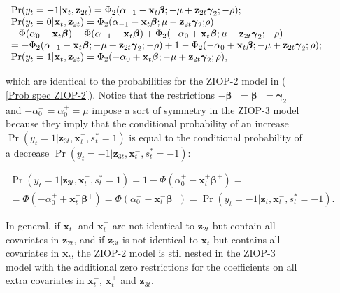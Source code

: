 \documentclass[letterpaper,fleqn,12pt]{article}
\begin{document}
\begin{figure}[H]
\begin{onehalfspace}
\bigskip

$%
\begin{array}{l}
\Pr (y_{t}=-1|\mathbf{x}_{t},\mathbf{z}_{2t})=\Phi _{2}(\alpha _{-1}-\mathbf{%
x}_{t}\mathbf{\beta };-\mu +\mathbf{z}_{2t}\mathbf{\gamma }_{2}\mathbf{;-}%
\rho ); \\ 
\Pr (y_{t}=0|\mathbf{x}_{t},\mathbf{z}_{2t})=\Phi _{2}(\alpha _{-1}-\mathbf{x%
}_{t}\mathbf{\beta };\mu -\mathbf{z}_{2t}\mathbf{\gamma }_{2}\mathbf{;}\rho )
\\ 
+\Phi (\alpha _{0}-\mathbf{x}_{t}\mathbf{\beta })-\Phi (\alpha _{-1}-\mathbf{%
x}_{t}\mathbf{\beta })+\Phi _{2}(-\alpha _{0}+\mathbf{x}_{t}\mathbf{\beta }%
;\mu -\mathbf{z}_{2t}\mathbf{\gamma }_{2};\mathbf{-}\rho ) \\ 
=-\Phi _{2}(\alpha _{-1}-\mathbf{x}_{t}\mathbf{\beta };-\mu +\mathbf{z}_{2t}%
\mathbf{\gamma }_{2}\mathbf{;-}\rho )+1-\Phi _{2}(-\alpha _{0}+\mathbf{x}_{t}%
\mathbf{\beta };-\mu +\mathbf{z}_{2t}\mathbf{\gamma }_{2};\rho ); \\ 
\Pr (y_{t}=1|\mathbf{x}_{t},\mathbf{z}_{2t})=\Phi _{2}(-\alpha _{0}+\mathbf{x%
}_{t}\mathbf{\beta };-\mu +\mathbf{z}_{2t}\mathbf{\gamma }_{2};\rho ),%
\end{array}%
$

\bigskip

\noindent which are identical to the probabilities for the ZIOP-2 model in (%
\ref{Prob spec ZIOP-2}). Notice that the restrictions $-\mathbf{\beta }^{-}=%
\mathbf{\beta }^{+}=\mathbf{\gamma }_{2}$ and $-\alpha _{0}^{-}=\alpha
_{0}^{+}=\mu $ impose a sort of symmetry in the ZIOP-3 model because they
imply that the conditional probability of an increase $\Pr (y_{t}=1|\mathbf{z%
}_{3t},\mathbf{x}_{t}^{+},s_{t}^{\ast }=1)$ is equal to the conditional
probability of a decrease $\Pr (y_{t}=-1|\mathbf{z}_{3t},\mathbf{x}%
_{t}^{-},s_{t}^{\ast }=-1)$:

\medskip

\begin{gather*}
\Pr (y_{t}=1|\mathbf{z}_{3t},\mathbf{x}_{t}^{+},s_{t}^{\ast }=1)=1-\Phi
(\alpha _{0}^{+}-\mathbf{x}_{t}^{+}\mathbf{\beta }^{+})= \\
=\Phi (-\alpha _{0}^{+}+\mathbf{x}_{t}^{+}\mathbf{\beta }^{+})=\Phi (\alpha
_{0}^{-}-\mathbf{x}_{t}^{-}\mathbf{\beta }^{-})=\Pr (y_{t}=-1|\mathbf{z}_{t},%
\mathbf{x}_{t}^{-},s_{t}^{\ast }=-1)\text{.}
\end{gather*}

\medskip

In general, if $\mathbf{x}_{t}^{-}$ and $\mathbf{x}_{t}^{+}$ are not
identical to $\mathbf{z}_{2t}$ but contain all covariates in $\mathbf{z}%
_{2t} $, and if $\mathbf{z}_{3t}$ is not identical to $\mathbf{x}_{t}$ but
contains all covariates in $\mathbf{x}_{t}$, the ZIOP-2 model is stil nested
in the ZIOP-3 model with the additional zero restrictions for the
coefficients on all extra covariates in $\mathbf{x}_{t}^{-}$, $\mathbf{x}%
_{t}^{+}$ and $\mathbf{z}_{3t}$.


\end{onehalfspace}
\end{figure}
\end{document}
